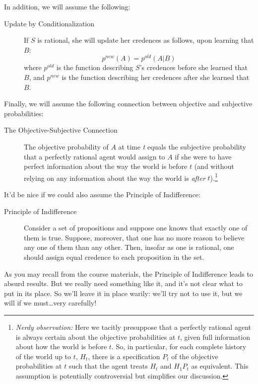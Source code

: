 \documentclass[12pt,letterpaper]{article}
\begin{document}
{\begin{description}
\end{description}
In addition, we will assume the following:
\begin{description}
\item[Update by Conditionalization]
If $S$ is rational, she will update her credences as follows, upon learning that $B$:
$$p^{new}(A) = p^{old}(A|B)$$
where  $p^{old}$ is the function describing $S$'s credences before she learned that $B$, and $p^{new}$ is the function describing her credences after she learned that $B$.
\end{description}
Finally, we will assume the following connection between objective and subjective probabilities:
 \begin{description}
\item[The Objective-Subjective Connection]
The objective probability of $A$ at time \emph{t} equals the subjective probability that a perfectly rational agent would assign to $A$ if she were to have perfect information about the way the world is before $t$ (and without relying on any information about the way the world is \textit{after} $t$).\footnote{
\emph{Nerdy observation:} Here we tacitly presuppose that a perfectly rational agent is always certain about the objective probabilities at $t$, given full information about how the world is before $t$. So, in particular, for each complete history of the world up to $t$, $H_t$, there is a specification $P_t$ of the objective probabilities at $t$ such that the agent treats $H_t$ and $H_1 P_t$ as equivalent. This assumption is potentially controversial but simplifies our discussion.
}
\end{description}

\newpage 

It'd be nice if we could also assume the Principle of Indifference:

\begin{description}
\item[Principle of Indifference]
Consider a set of propositions and suppose one knows that exactly one of them is true. Suppose, moreover, that one has no more reason to believe any one of them than any other. Then, insofar as one is rational, one should assign equal credence to each proposition in the set.

\end{description}
 As you may recall from the course materials, the Principle of Indifference leads to absurd results. But we really need something like it, and it's not clear what to put in its place. So we'll leave it in place warily: we'll try not to use it, but we will if we must\dots very carefully!


}
\end{document}
